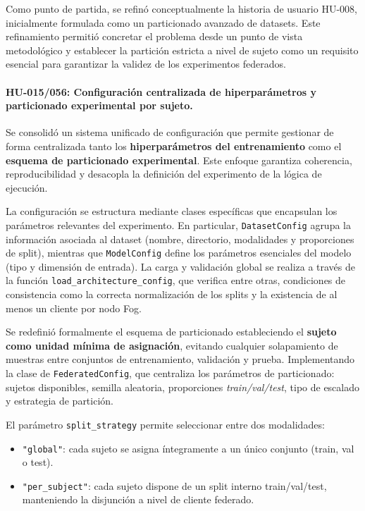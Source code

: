 \documentclass{report}
\begin{document}
Como punto de partida, se refinó conceptualmente la historia de usuario HU-008, inicialmente formulada como un particionado avanzado de datasets. Este refinamiento permitió concretar el problema desde un punto de vista metodológico y establecer la partición estricta a nivel de sujeto como un requisito esencial para garantizar la validez de los experimentos federados.

\vspace{0.15em}
\paragraph{HU-015/056: Configuración centralizada de hiperparámetros y particionado experimental por sujeto.}

Se consolidó un sistema unificado de configuración que permite gestionar de forma centralizada tanto los \textbf{hiperparámetros del entrenamiento} como el \textbf{esquema de particionado experimental}. Este enfoque garantiza coherencia, reproducibilidad y desacopla la definición del experimento de la lógica de ejecución.

La configuración se estructura mediante clases específicas que encapsulan los parámetros relevantes del experimento. En particular, \texttt{DatasetConfig} agrupa la información asociada al dataset (nombre, directorio, modalidades y proporciones de split), mientras que \texttt{ModelConfig} define los parámetros esenciales del modelo (tipo y dimensión de entrada). La carga y validación global se realiza a través de la función \texttt{load\_architecture\_config}, que verifica entre otras, condiciones de consistencia como la correcta normalización de los splits y la existencia de al menos un cliente por nodo Fog.

Se redefinió formalmente el esquema de particionado estableciendo el \textbf{sujeto como unidad mínima de asignación}, evitando cualquier solapamiento de muestras entre conjuntos de entrenamiento, validación y prueba. Implementando la clase de \texttt{FederatedConfig}, que centraliza los parámetros de particionado: sujetos disponibles, semilla aleatoria, proporciones \textit{train/val/test}, tipo de escalado y estrategia de partición.

El parámetro \texttt{split\_strategy} permite seleccionar entre dos modalidades:
\begin{itemize}
    \item \texttt{"global"}: cada sujeto se asigna íntegramente a un único conjunto (train, val o test).
    \item \texttt{"per\_subject"}: cada sujeto dispone de un split interno train/val/test, manteniendo la disjunción a nivel de cliente federado.
\end{itemize}
\end{document}
